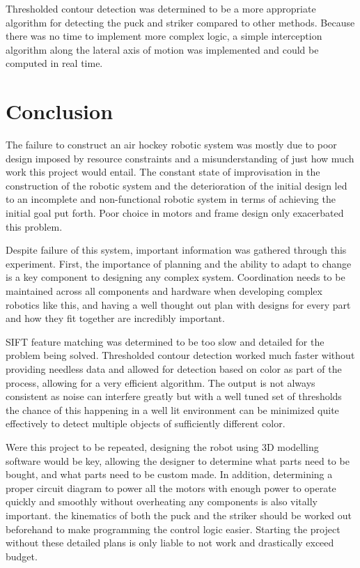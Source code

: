 \documentclass[letterpaper, 12 pt, conference]{ieeeconf}
\begin{document}
Thresholded contour detection was determined to be a more appropriate algorithm for detecting the puck and striker compared to other methods. Because there was no time to implement more complex logic, a simple interception algorithm along the lateral axis of motion was implemented and could be computed in real time.

\section{Conclusion}
\label{conclusion}
The failure to construct an air hockey robotic system was mostly due to poor design imposed by resource constraints and a misunderstanding of just how much work this project would entail. The constant state of improvisation in the construction of the robotic system and the deterioration of the initial design led to an incomplete and non-functional robotic system in terms of achieving the initial goal put forth. Poor choice in motors and frame design only exacerbated this problem.

Despite failure of this system, important information was gathered through this experiment. First, the importance of planning and the ability to adapt to change is a key component to designing any complex system. Coordination needs to be maintained across all components and hardware when developing complex robotics like this, and having a well thought out plan with designs for every part and how they fit together are incredibly important. 

SIFT feature matching was determined to be too slow and detailed for the problem being solved. Thresholded contour detection worked much faster without providing needless data and allowed for detection based on color as part of the process, allowing for a very efficient algorithm. The output is not always consistent as noise can interfere greatly but with a well tuned set of thresholds the chance of this happening in a well lit environment can be minimized quite effectively to detect multiple objects of sufficiently different color.

Were this project to be repeated, designing the robot using 3D modelling software would be key, allowing the designer to determine what parts need to be bought, and what parts need to be custom made. In addition, determining a proper circuit diagram to power all the motors with enough power to operate quickly and smoothly without overheating any components is also vitally important. the kinematics of both the puck and the striker should be worked out beforehand to make programming the control logic easier. Starting the project without these detailed plans is only liable to not work and drastically exceed budget.
\end{document}
